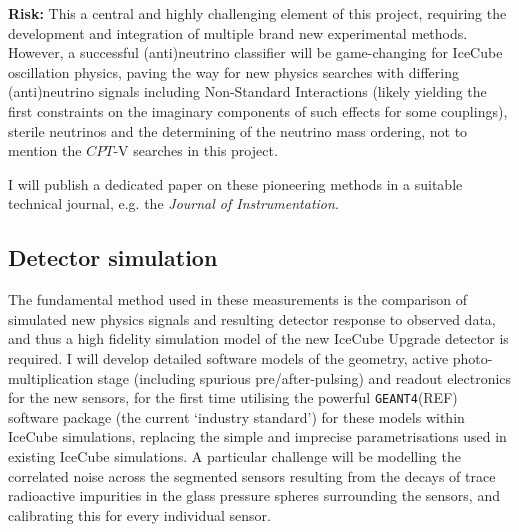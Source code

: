 \documentclass[a4paper,11pt]{article}
\begin{document}
\textbf{Risk:} This a central and highly challenging element of this project, requiring the development and integration of multiple brand new experimental methods. However, a successful (anti)neutrino classifier will be game-changing for IceCube oscillation physics, paving the way for new physics searches with differing (anti)neutrino signals including Non-Standard Interactions (likely yielding the first constraints on the imaginary components of such effects for some couplings), sterile neutrinos and the determining of the neutrino mass ordering, not to mention the $CPT$-V searches in this project. 

I will publish a dedicated paper on these pioneering methods in a suitable technical journal, e.g. the \textit{Journal of Instrumentation}. \\








\subsection{Detector simulation}

The fundamental method used in these measurements is the comparison of simulated new physics signals and resulting detector response to observed data, and thus a high fidelity simulation model of the new IceCube Upgrade detector is required. I will develop detailed software models of the geometry, active photo-multiplication stage (including spurious pre/after-pulsing) and readout electronics for the new sensors, for the first time utilising the powerful \texttt{GEANT4}(REF) software package (the current `industry standard') for these models within IceCube simulations, replacing the simple and imprecise parametrisations used in existing IceCube simulations. A particular challenge will be modelling the correlated noise across the segmented sensors resulting from the decays of trace radioactive impurities in the glass pressure spheres surrounding the sensors, and calibrating this for every individual sensor. 
\end{document}

